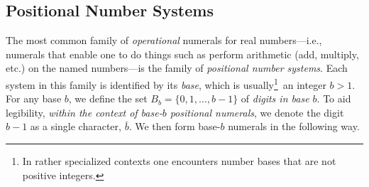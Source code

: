 \subsection{Positional Number Systems}
\label{sec:positional-numbers}

The most common family of {\em operational}
 numerals for real numbers---i.e.,
numerals that enable one to do things such as perform arithmetic (add,
multiply, etc.) on the named numbers---is the family of {\it
  positional number systems}.  Each system in this family is
identified by its {\em base}, 
which is usually\footnote{In rather specialized contexts one
  encounters number bases that are not positive integers.}~an
integer $b >1$.
For any base $b$, we define the set $B_b = \{ 0, 1, \ldots, b-1\}$ of
{\it digits in base $b$}.
%
To aid legibility, {\em within the context of base-$b$ positional
  numerals}, we denote the digit $b-1$ as a single character, $\bar{b}$.
%
We then form base-$b$ numerals in the following way.
\medskip

\noindent {}
\medskip

